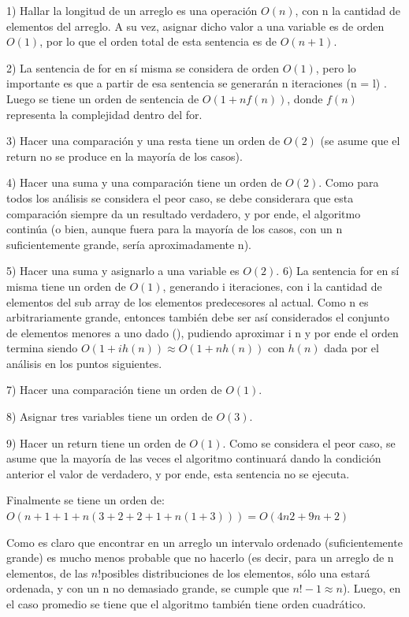 \documentclass[titlepage,a4paper]{article}
\begin{document}
1)  Hallar la longitud de un arreglo es una operación $O(n)$, con n la cantidad de elementos del arreglo. A su vez, asignar dicho valor a una variable es de orden $O(1)$, por lo que el orden total de esta sentencia es de $O(n + 1)$.

2) La sentencia de for en sí misma se considera de orden $O(1)$, pero lo importante es que a partir de esa sentencia se generarán n iteraciones (n = l) .  Luego se tiene un orden de sentencia de $O(1 + nf(n))$, donde $f(n)$ representa la complejidad dentro del for.

3) Hacer una comparación y una resta tiene un orden de $O(2)$ (se asume que el return no se produce en la mayoría de los casos).

4) Hacer una suma y una comparación tiene un orden de $O(2)$. Como para todos los análisis se considera el peor caso, se debe considerara que esta comparación siempre da un resultado verdadero, y por ende, el algoritmo continúa (o bien, aunque fuera para la mayoría de los casos, con un n suficientemente grande, sería aproximadamente n).

5) Hacer una suma y asignarlo a una variable es $O(2)$.
6) La sentencia for en sí misma tiene un orden de $O(1)$, generando i iteraciones, con i la cantidad de elementos del sub array de los elementos predecesores al actual. Como n es arbitrariamente grande, entonces también debe ser así considerados el conjunto de elementos menores a uno dado (), pudiendo aproximar i n y por ende el orden termina siendo $O(1 + i h(n))  \approx  O(1 + n h(n))$ con $h(n)$ dada por el análisis en los puntos siguientes.

7) Hacer una comparación tiene un orden de $O(1)$.

8) Asignar tres variables tiene un orden de $O(3)$.
 
9) Hacer un return tiene un orden de $O(1)$. Como se considera el peor caso, se asume que la mayoría de las veces el algoritmo continuará dando la condición anterior el valor de verdadero, y por ende, esta sentencia no se ejecuta.

Finalmente se tiene un orden de:
$O( n + 1 + 1 + n(3 + 2 + 2 + 1 + n(1 + 3) ) ) = O( 4n2 + 9n + 2)$

Como es claro que encontrar en un arreglo un intervalo ordenado (suficientemente grande) es mucho menos probable que no hacerlo (es decir, para un arreglo de n elementos, de las $n!$posibles distribuciones de los elementos, sólo una estará ordenada, y con un n no demasiado grande, se cumple que $n!-1 \approx n$). Luego, en el caso promedio se tiene que el algoritmo también tiene orden cuadrático.
\end{document}
